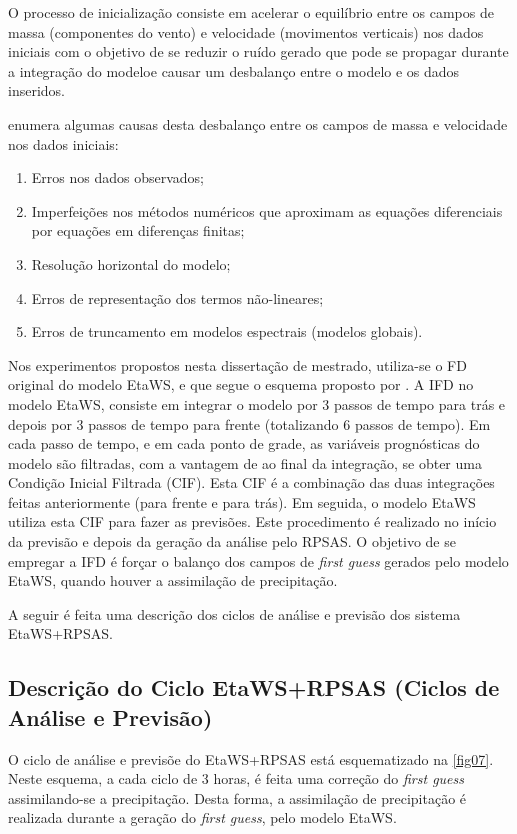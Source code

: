 O processo de inicialização consiste em acelerar o equilíbrio entre os campos de massa (componentes do vento) e velocidade (movimentos verticais) nos dados iniciais com o objetivo de se reduzir o ruído gerado que pode se propagar durante a integração do modeloe causar um desbalanço entre o modelo e os dados inseridos. 

 enumera algumas causas desta desbalanço entre os campos de massa e velocidade nos dados iniciais:

\begin{enumerate}
\item Erros nos dados observados;
\item Imperfeições nos métodos numéricos que aproximam as equações diferenciais por equações em diferenças finitas;
\item Resolução horizontal do modelo;
\item Erros de representação dos termos não-lineares;
\item Erros de truncamento em modelos espectrais (modelos globais).
\end{enumerate}

Nos experimentos propostos nesta dissertação de mestrado, utiliza-se o FD original do modelo EtaWS, e que segue o esquema proposto por . A IFD no modelo EtaWS, consiste em integrar o modelo por 3 passos de tempo para trás e depois por 3 passos de tempo para frente (totalizando 6 passos de tempo). Em cada passo de tempo, e em cada ponto de grade, as variáveis prognósticas do modelo são filtradas, com a vantagem de ao final da integração, se obter uma Condição Inicial Filtrada (CIF). Esta CIF é a combinação das duas integrações feitas anteriormente (para frente e para trás). Em seguida, o modelo EtaWS utiliza esta CIF para fazer as previsões. Este procedimento é realizado no início da previsão e depois da geração da análise pelo RPSAS. O objetivo de se empregar a IFD é forçar o balanço dos campos de \textit{first guess} gerados pelo modelo EtaWS, quando houver a assimilação de precipitação.

A seguir é feita uma descrição dos ciclos de análise e previsão dos sistema EtaWS+RPSAS.

\subsection{Descrição do Ciclo EtaWS+RPSAS (Ciclos de Análise e Previsão)}

O ciclo de análise e previsõe do EtaWS+RPSAS está esquematizado na \autoref{fig07}. Neste esquema, a cada ciclo de 3 horas, é feita uma correção do \textit{first guess} assimilando-se a precipitação. Desta forma, a assimilação de precipitação é realizada durante a geração do \textit{first guess}, pelo modelo EtaWS. 

